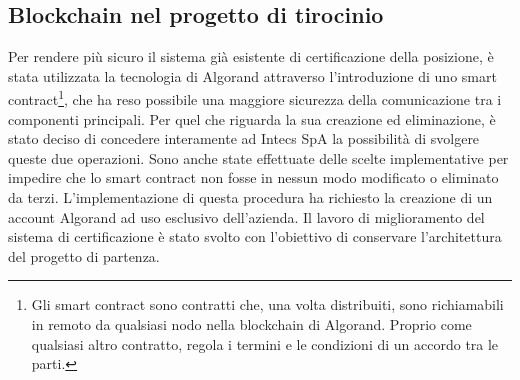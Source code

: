 
\subsection{Blockchain nel progetto di tirocinio}
Per rendere più sicuro il sistema già esistente di certificazione della posizione, è stata utilizzata la tecnologia di Algorand \cite{algorand} attraverso l'introduzione di uno smart contract\footnote{Gli smart contract sono contratti che, una volta distribuiti, sono richiamabili in remoto da qualsiasi nodo nella blockchain di Algorand. Proprio come qualsiasi altro contratto, regola i termini e le condizioni di un accordo tra le parti.}, che ha reso possibile una maggiore sicurezza della comunicazione tra i componenti principali. Per quel che riguarda la sua creazione ed eliminazione, è stato deciso di concedere interamente ad Intecs SpA la possibilità di svolgere queste due operazioni. Sono anche state effettuate delle scelte implementative per impedire che lo smart contract non fosse in nessun modo modificato o eliminato da terzi. L'implementazione di questa procedura ha richiesto la creazione di un account Algorand ad uso esclusivo dell'azienda. Il lavoro di miglioramento del sistema di certificazione è stato svolto con l'obiettivo di conservare l'architettura del progetto di partenza.

